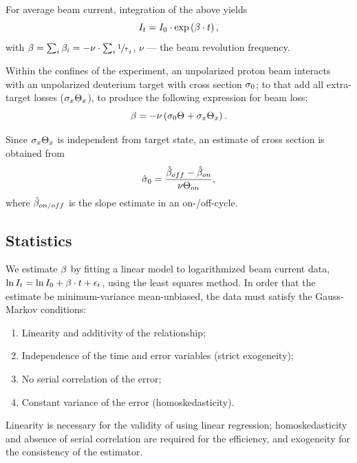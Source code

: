 \documentclass[reprint]{revtex4-1}
\begin{document}
For average beam current, integration of the above yields
\begin{equation}\label{eq:CurrentDecay}
	I_t = I_0 \cdot \exp\bkt{\slp\cdot t},
\end{equation}
with $\slp = \sum_i \slp[i] = - \nu\cdot\sum_i \sfrac1\tau_i$, $\nu$ --- the beam revolution frequency. 

Within the confines of the experiment, an unpolarized proton beam interacts with an unpolarized deuterium target with cross section $\CS[0]$; to that add all extra-target losses ($\CS[x]\Thick[x]$), to produce the following expression for beam loss:
\begin{equation}\label{eq:SlopeModel}
	\slp = -\nu\bkt{\CS[0]\Thick + \CS[x]\Thick[x]}.
\end{equation}

Since $\CS[x]\Thick[x]$ is independent from target state, an estimate of cross section is obtained from  
\begin{equation}
	\CS*[0] = \frac{\slp*[off] - \slp*[on]}{\nu\Thick[on]},
\end{equation}
where $\slp*[on/off]$ is the slope estimate in an on-/off-cycle.

\subsection{Statistics}

We estimate $\slp$ by fitting a linear model to logarithmized beam current data, $\ln I_t = \ln I_0 + \slp\cdot t + \epsilon_t$, using the least squares method. In order that the estimate be minimum-variance mean-unbiased, the data must satisfy the Gauss-Markov conditions:~\cite{GaussMarkov}
\begin{enumerate}
	\item Linearity and additivity of the relationship;
	\item Independence of the time and error variables (strict exogeneity);
	\item No serial correlation of the error;
	\item Constant variance of the error (homoskedasticity).
\end{enumerate}

Linearity is necessary for the validity of using linear regression; homoskedasticity and absence of serial correlation are required for the efficiency, and exogeneity for the consistency of the estimator.
\end{document}
